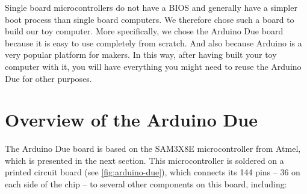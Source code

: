 Single board microcontrollers do not have a BIOS and generally have a simpler
boot process than single board computers. We therefore chose such a board to
build our toy computer. More specifically, we chose the Arduino Due board
because it is easy to use completely from scratch. And also because Arduino is
a very popular platform for makers. In this way, after having built your toy
computer with it, you will have everything you might need to reuse the Arduino
Due for other purposes.

\section{Overview of the Arduino Due}\label{section:overview-due}

The Arduino Due board is based on the SAM3X8E microcontroller from Atmel, which
is presented in the next section. This microcontroller is soldered on a printed
circuit board (see \cref{fig:arduino-due}), which connects its 144 pins -- 36
on each side of the chip -- to several other components on this board,
including:
